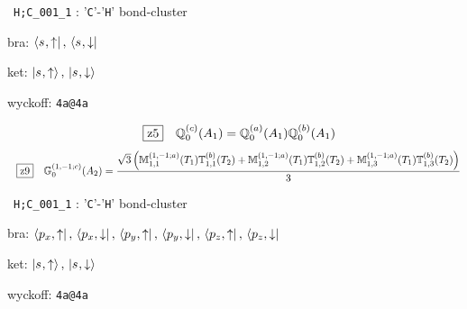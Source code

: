 \documentclass[fleqn,10pt,landscape]{jsarticle}
\begin{document}
\noindent\textbullet\, \texttt{H;C_001_1} : '\texttt{C}'-'\texttt{H}' bond-cluster

\noindent\quad * bra: $\bra{s_{},\uparrow},\, \bra{s_{},\downarrow}$

\noindent\quad * ket: $\ket{s_{},\uparrow},\, \ket{s_{},\downarrow}$

\noindent\quad * wyckoff: \texttt{4a@4a}

\begin{dmath*}
\hspace*{3mm}\fbox{z5}\quad \mathbb{Q}_{0}^{(c)}(A_{1})=\mathbb{Q}_{0}^{(a)}(A_{1}) \mathbb{Q}_{0}^{(b)}(A_{1})
\end{dmath*}
\begin{dmath*}
\hspace*{3mm}\fbox{z9}\quad \mathbb{G}_{0}^{(1,-1;c)}(A_{2})=\frac{\sqrt{3} \left(\mathbb{M}_{1,1}^{(1,-1;a)}(T_{1}) \mathbb{T}_{1,1}^{(b)}(T_{2}) + \mathbb{M}_{1,2}^{(1,-1;a)}(T_{1}) \mathbb{T}_{1,2}^{(b)}(T_{2}) + \mathbb{M}_{1,3}^{(1,-1;a)}(T_{1}) \mathbb{T}_{1,3}^{(b)}(T_{2})\right)}{3}
\end{dmath*}
\vspace{5mm}

\noindent\textbullet\, \texttt{H;C_001_1} : '\texttt{C}'-'\texttt{H}' bond-cluster

\noindent\quad * bra: $\bra{p_{x},\uparrow},\, \bra{p_{x},\downarrow},\, \bra{p_{y},\uparrow},\, \bra{p_{y},\downarrow},\, \bra{p_{z},\uparrow},\, \bra{p_{z},\downarrow}$

\noindent\quad * ket: $\ket{s_{},\uparrow},\, \ket{s_{},\downarrow}$

\noindent\quad * wyckoff: \texttt{4a@4a}
\end{document}
